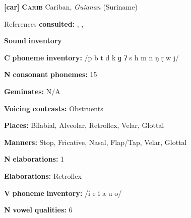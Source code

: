 \begin{styleBody}
\textbf{[car]}   \textbf{\textsc{Carib}  }  Cariban, \textit{Guianan} (Suriname)
\end{styleBody}

\begin{styleBody}
References \textbf{consulted:} \citet{Courtz2008}, \citet{Hoff1968}, \citet{Peasgood1972}
\end{styleBody}

\begin{styleBody}
\textbf{Sound} \textbf{inventory}
\end{styleBody}

\begin{styleBody}
\textbf{C} \textbf{phoneme} \textbf{inventory:} /p b t d k ɡ ʔ s h m n ŋ ɽ w j/
\end{styleBody}

\begin{styleBody}
\textbf{N} \textbf{consonant} \textbf{phonemes:} 15
\end{styleBody}

\begin{styleBody}
\textbf{Geminates:} N/A
\end{styleBody}

\begin{styleBody}
\textbf{Voicing} \textbf{contrasts:} Obstruents
\end{styleBody}

\begin{styleBody}
\textbf{Places:} Bilabial, Alveolar, Retroflex, Velar, Glottal
\end{styleBody}

\begin{styleBody}
\textbf{Manners:} Stop, Fricative, Nasal, Flap/Tap, Velar, Glottal
\end{styleBody}

\begin{styleBody}
\textbf{N} \textbf{elaborations:} 1
\end{styleBody}

\begin{styleBody}
\textbf{Elaborations:} Retroflex
\end{styleBody}

\begin{styleBody}
\textbf{V} \textbf{phoneme} \textbf{inventory:} /i e ɨ a u o/
\end{styleBody}

\begin{styleBody}
\textbf{N} \textbf{vowel} \textbf{qualities:} 6
\end{styleBody}

